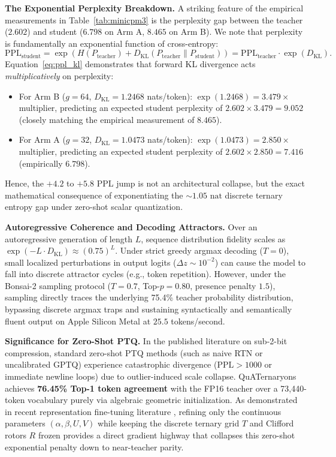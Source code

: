 \documentclass{article}
\begin{document}
\textbf{The Exponential Perplexity Breakdown.}
A striking feature of the empirical measurements in Table~\ref{tab:minicpm3} is the perplexity gap between the teacher ($2.602$) and student ($6.798$ on Arm A, $8.465$ on Arm B). We note that perplexity is fundamentally an exponential function of cross-entropy:
\begin{equation}
\label{eq:ppl_kl}
\mathrm{PPL}_{\mathrm{student}} = \exp\left( H(P_{\mathrm{teacher}}) + D_{\mathrm{KL}}(P_{\mathrm{teacher}} \parallel P_{\mathrm{student}}) \right) = \mathrm{PPL}_{\mathrm{teacher}} \cdot \exp\left( D_{\mathrm{KL}} \right).
\end{equation}
Equation~\eqref{eq:ppl_kl} demonstrates that forward KL divergence acts \emph{multiplicatively} on perplexity:
\begin{itemize}[leftmargin=*]
\item For Arm B ($g=64$, $D_{\mathrm{KL}} = 1.2468$ nats/token): $\exp(1.2468) = \mathbf{3.479\times}$ multiplier, predicting an expected student perplexity of $2.602 \times 3.479 = \mathbf{9.052}$ (closely matching the empirical measurement of $8.465$).
\item For Arm A ($g=32$, $D_{\mathrm{KL}} = 1.0473$ nats/token): $\exp(1.0473) = \mathbf{2.850\times}$ multiplier, predicting an expected student perplexity of $2.602 \times 2.850 = \mathbf{7.416}$ (empirically $6.798$).
\end{itemize}
Hence, the $+4.2$ to $+5.8$ PPL jump is not an architectural collapse, but the exact mathematical consequence of exponentiating the $\sim 1.05\text{ nat}$ discrete ternary entropy gap under zero-shot scalar quantization.

\textbf{Autoregressive Coherence and Decoding Attractors.}
Over an autoregressive generation of length $L$, sequence distribution fidelity scales as $\exp(-L \cdot D_{\mathrm{KL}}) \approx (0.75)^L$. Under strict greedy argmax decoding ($T=0$), small localized perturbations in output logits ($\Delta z \sim 10^{-2}$) can cause the model to fall into discrete attractor cycles (e.g., token repetition). However, under the Bonsai-2 sampling protocol ($T=0.7$, Top-$p=0.80$, presence penalty $1.5$), sampling directly traces the underlying 75.4\% teacher probability distribution, bypassing discrete argmax traps and sustaining syntactically and semantically fluent output on Apple Silicon Metal at $25.5$ tokens/second.

\textbf{Significance for Zero-Shot PTQ.}
In the published literature on sub-2-bit compression, standard zero-shot PTQ methods (such as naive RTN or uncalibrated GPTQ) experience catastrophic divergence ($\mathrm{PPL} > 1000$ or immediate newline loops) due to outlier-induced scale collapse. QuATernaryons achieves \textbf{76.45\% Top-1 token agreement} with the FP16 teacher over a 73,440-token vocabulary purely via algebraic geometric initialization. As demonstrated in recent representation fine-tuning literature \citep{malinovskii2024pvtuning,zhang2026catq}, refining only the continuous parameters $(\alpha, \beta, U, V)$ while keeping the discrete ternary grid $T$ and Clifford rotors $R$ frozen provides a direct gradient highway that collapses this zero-shot exponential penalty down to near-teacher parity.
\end{document}
